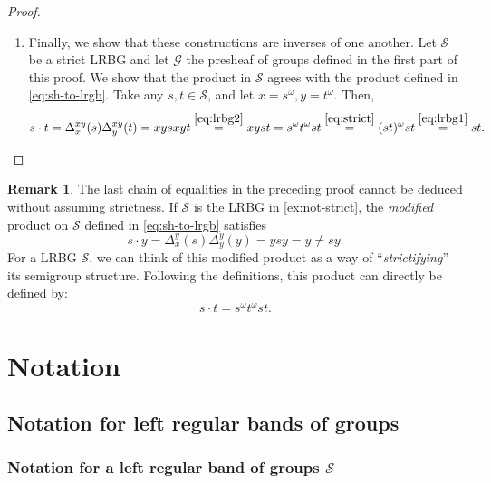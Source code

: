 \documentclass[11pt, oneside, reqno]{amsart}
\theoremstyle{definition}
\newtheorem{remark}[theorem]{Remark}
\numberwithin{equation}{section}
\def \GG{{\mathcal{G}}}
\def \SS{{\mathcal{S}}}
\begin{document}
\begin{proof}
\begin{enumerate}[wide]
    \item
    Finally, we show that these constructions are inverses of one another.
    Let $\SS$ be a strict LRBG and let $\GG$ the presheaf of groups defined in
    the first part of this proof.
    We show that the product in $\SS$ agrees with the product defined in \cref{eq:sh-to-lrgb}.
    Take any $s,t \in \SS$, and let $x = s^\omega, y = t^\omega$. Then,
    \[
        s \cdot t =
        \Delta_x^{xy}(s) \Delta_y^{xy}(t) = xys xyt
        \overset{\cref{eq:lrbg2}}{=}
        xy st
        =
        s^\omega t^\omega s t
        \overset{\cref{eq:strict}}{=}
        (st)^\omega st
        \overset{\cref{eq:lrbg1}}{=}
        st.
        \qedhere
    \]
    \end{enumerate}
 \end{proof}

\begin{remark}
    The last chain of equalities in the preceding proof cannot be deduced without assuming strictness.
    If $\SS$ is the LRBG in \cref{ex:not-strict}, the {\em modified} product on $\SS$
    defined in \cref{eq:sh-to-lrgb} satisfies
    \[
        s \cdot y = \Delta_{x}^{y}(s) \Delta_y^y(y) = ysy = y \neq s y.
    \]
    For a LRBG $\SS$, we can think of this modified product as a way of ``\emph{strictifying}'' its semigroup structure.
    Following the definitions, this product can directly be defined by:
    \[  s \cdot t = s^\omega t^\omega s t. \]
\end{remark}

\newpage

\section{Notation}

\subsection*{Notation for left regular bands of groups}

\subsubsection*{Notation for a left regular band of groups $\SS$}
\end{document}
